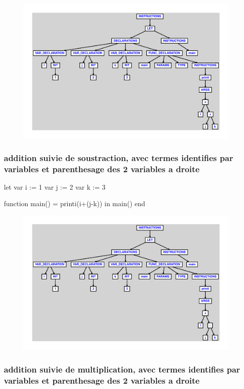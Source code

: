 \documentclass{article}
\begin{document}
\begin{figure}[H]\centering\includegraphics[max width=\textwidth]{ast/ast_111.pdf}\end{figure}\subsubsection{addition suivie de soustraction, avec termes identifies par variables et parenthesage des 2 variables a droite}
\begin{verbatimtab}
let
	var i := 1
	var j := 2
	var k := 3

	function main() = printi(i+(j-k))
in main() end
\end{verbatimtab}
\begin{figure}[H]\centering\includegraphics[max width=\textwidth]{ast/ast_112.pdf}\end{figure}\subsubsection{addition suivie de multiplication, avec termes identifies par variables et parenthesage des 2 variables a droite}
\end{document}

